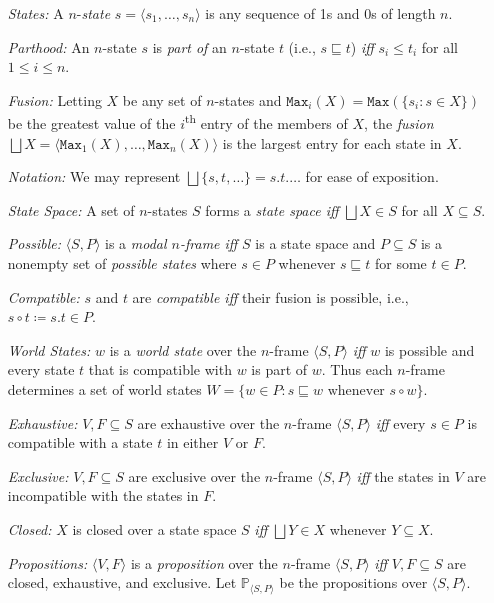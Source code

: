 \documentclass[a4paper, 11pt]{article} %
\newcommand{\tuple}[1]{\langle#1\rangle} %
\newcommand{\set}[1]{\lbrace#1\rbrace} %
\renewcommand{\P}[0]{\mathbb{P}}
\renewcommand{\max}[0]{\texttt{Max}}
\begin{document}
\begin{enumerate}
  \item[\it States:] A $n$-\textit{state} $s=\tuple{s_1,\ldots,s_n}$ is any sequence of 1s and 0s of length $n$.
  \item[\it Parthood:] An $n$-state $s$ is \textit{part of} an $n$-state $t$ (i.e., $s\sqsubseteq t$) \textit{iff} $s_i\leq t_i$ for all $1\leq i\leq n$.
  \item[\it Fusion:] Letting $X$ be any set of $n$-states and $\max_i(X)=\max(\set{s_i:s\in X})$ be the greatest value of the $i$\textsuperscript{th} entry of the members of $X$, the \textit{fusion} $\bigsqcup X=\tuple{\max_1(X),\ldots,\max_n(X)}$ is the largest entry for each state in $X$.
  \item[\it Notation:] We may represent $\bigsqcup\set{s,t,\ldots}=s.t.\ldots$ for ease of exposition.
  \item[\it State Space:] A set of $n$-states $S$ forms a \textit{state space iff} $\bigsqcup X\in S$ for all $X\subseteq S$.
  \item[\it Possible:] $\tuple{S,P}$ is a \textit{modal $n$-frame iff} $S$ is a state space and $P\subseteq S$ is a nonempty set of \textit{possible states} where $s\in P$ whenever $s\sqsubseteq t$ for some $t\in P$.
  \item[\it Compatible:] $s$ and $t$ are \textit{compatible iff} their fusion is possible, i.e., $s\circ t\coloneq s.t\in P$.
  \item[\it World States:] $w$ is a \textit{world state} over the $n$-frame $\tuple{S,P}$ \textit{iff} $w$ is possible and every state $t$ that is compatible with $w$ is part of $w$. Thus each $n$-frame determines a set of world states $W=\set{w\in P: s\sqsubseteq w \text{ whenever } s\circ w}$.
  \item[\it Exhaustive:] $V,F\subseteq S$ are exhaustive over the $n$-frame $\tuple{S,P}$ \textit{iff} every $s\in P$ is compatible with a state $t$ in either $V$ or $F$.
  \item[\it Exclusive:] $V,F\subseteq S$ are exclusive over the $n$-frame $\tuple{S,P}$ \textit{iff} the states in $V$ are incompatible with the states in $F$.
  \item[\it Closed:] $X$ is closed over a state space $S$ \textit{iff} $\bigsqcup Y\in X$ whenever $Y\subseteq X$.
  \item[\it Propositions:] $\tuple{V,F}$ is a \textit{proposition} over the $n$-frame $\tuple{S,P}$ \textit{iff} $V,F\subseteq S$ are closed, exhaustive, and exclusive.
    Let $\P_{\tuple{S,P}}$ be the propositions over $\tuple{S,P}$.

\end{enumerate}
\end{document}
